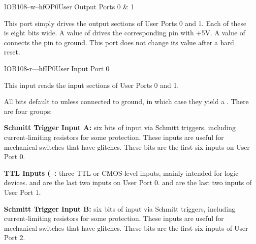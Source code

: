 \begin{ioport}{IOB}{108}{--w--hf}{OP0}{User Output Ports 0 \& 1}

  This port simply drives the output sections of User Ports 0 and 1. Each of
  these is eight bits wide. A value of  drives the corresponding pin
  with +5V. A value of  connects the pin to ground. This port does not
  change its value after a hard reset.
  
  \begin{cbitfield}
  \end{cbitfield}
\end{ioport}

\begin{ioport}{IOB}{108}{-r---hf}{IP0}{User Input Port 0}

  This input reads the input sections of User Ports 0 and 1.

  \begin{cbitfield}
  \end{cbitfield}

  All bits default to  unless connected to ground, in which case they yield a . There are four groups:

  \begin{description}
  \item{\bfseries Schmitt Trigger Input A:} six bits of input via Schmitt triggers,
    including current-limiting resistors for some protection. These inputs are
    useful for mechanical switches that have glitches. These bits are the first
    six inputs on User Port 0.
  \item{\bfseries TTL Inputs (–:} three TTL or CMOS-level
    inputs, mainly intended for logic devices.  and  are
    the last two inputs on User Port 0.  and  are the last
    two inputs of User Port 1.
  \item{\bfseries Schmitt Trigger Input B:} six bits of input via Schmitt triggers,
    including current-limiting resistors for some protection. These inputs are
    useful for mechanical switches that have glitches. These bits are the first
    six inputs of User Port 2.
  \end{description}

\end{ioport}

